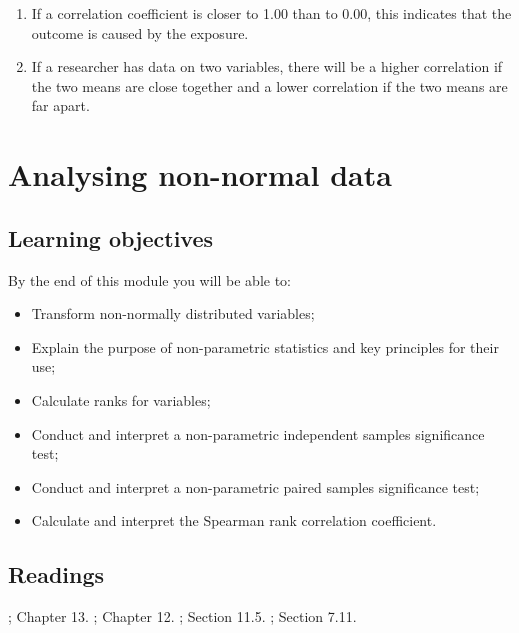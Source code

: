 \documentclass[
]{memoir}
\providecommand{\tightlist}{%
  \setlength{\itemsep}{0pt}\setlength{\parskip}{0pt}}
\begin{document}
\begin{enumerate}
\def\labelenumi{\alph{enumi})}
\tightlist
\item
  If a correlation coefficient is closer to 1.00 than to 0.00, this indicates that the outcome is caused by the exposure.
\item
  If a researcher has data on two variables, there will be a higher correlation if the two means are close together and a lower correlation if the two means are far apart.
\end{enumerate}

\hypertarget{analysing-non-normal-data}{%
\chapter{Analysing non-normal data}\label{analysing-non-normal-data}}

\hypertarget{learning-objectives-8}{%
\section*{Learning objectives}\label{learning-objectives-8}}

By the end of this module you will be able to:

\begin{itemize}
\tightlist
\item
  Transform non-normally distributed variables;
\item
  Explain the purpose of non-parametric statistics and key principles for their use;
\item
  Calculate ranks for variables;
\item
  Conduct and interpret a non-parametric independent samples significance test;
\item
  Conduct and interpret a non-parametric paired samples significance test;
\item
  Calculate and interpret the Spearman rank correlation coefficient.
\end{itemize}

\hypertarget{readings-8}{%
\section*{Readings}\label{readings-8}}

\citet{kirkwood_sterne01a}; Chapter 13.
\citet{bland15b}; Chapter 12.
\citet{juul_frydenberg14}; Section 11.5.
\citet{acock10}; Section 7.11.
\end{document}
